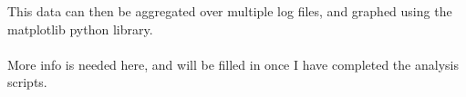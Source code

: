 \documentclass{sig-alternate-05-2015}
\begin{document}
This data can then be aggregated over multiple log files, and graphed using the matplotlib python library.\\\\
More info is needed here, and will be filled in once I have completed the analysis scripts.


 
\end{document}
